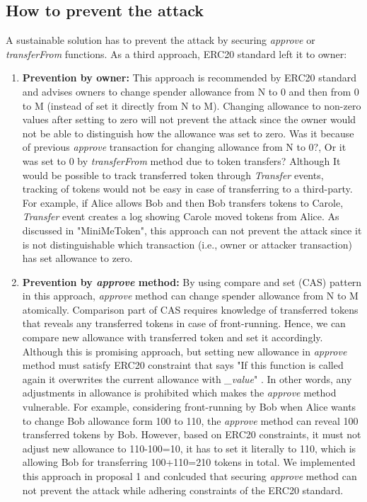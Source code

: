 \subsection{How to prevent the attack}
A sustainable solution has to prevent the attack by securing \textit{approve} or \textit{transferFrom} functions. As a third approach, ERC20 standard left it to owner:\newline

\begin{enumerate}[label=\Roman*.]
	\item \textbf{Prevention by owner:} This approach is recommended by ERC20 standard \cite{Ref08} and advises owners to change spender allowance from N to 0 and then from 0 to M (instead of set it directly from N to M). Changing allowance to non-zero values after setting to zero will not prevent the attack since the owner would not be able to distinguish how the allowance was set to zero. Was it because of previous \textit{approve} transaction for changing allowance from N to 0?, Or it was set to 0 by \textit{transferFrom} method due to token transfers? Although It would be possible to track transferred token through \textit{Transfer} events, tracking of tokens would not be easy in case of transferring to a third-party. For example, if Alice allows Bob and then Bob transfers tokens to Carole, \textit{Transfer} event creates a log showing Carole moved tokens from Alice. As discussed in "MiniMeToken", this approach can not prevent the attack since it is not distinguishable which transaction (i.e., owner or attacker transaction) has set allowance to zero.\newline
	
	\item \textbf{Prevention by \textit{approve} method:} By using compare and set (CAS) pattern \cite{Ref06} in this approach, \textit{approve} method can change spender allowance from N to M atomically. Comparison part of CAS requires knowledge of transferred tokens that reveals any transferred tokens in case of front-running. Hence, we can compare new allowance with transferred token and set it accordingly. Although this is promising approach, but setting new allowance in \textit{approve} method must satisfy ERC20 constraint that says "If this function is called again it overwrites the current allowance with \textit{\_value}" \cite{Ref08}. In other words, any adjustments in allowance is prohibited which makes the \textit{approve} method vulnerable. For example, considering front-running by Bob when Alice wants to change Bob allowance form 100 to 110, the \textit{approve} method can reveal 100 transferred tokens by Bob. However, based on ERC20 constraints, it must not adjust new allowance to 110-100=10, it has to set it literally to 110, which is allowing Bob for transferring 100+110=210 tokens in total. We implemented this approach in proposal 1 and conlcuded that securing \textit{approve} method can not prevent the attack while adhering constraints of the ERC20 standard.\newline
	

\end{enumerate}
